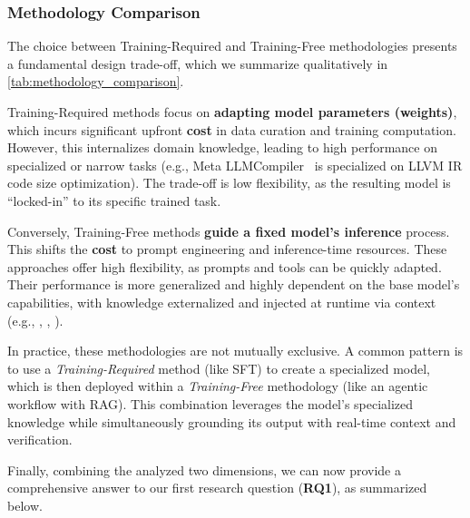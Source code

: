 \documentclass[pdflatex,sn-mathphys-ay,twocolumn, a4paper]{sn-jnl}%
\theoremstyle{thmstyleone}%
\theoremstyle{thmstyletwo}%
\theoremstyle{thmstylethree}%
\begin{document}
\subsubsection{Methodology Comparison}

The choice between Training-Required and Training-Free methodologies presents a fundamental design trade-off, which we summarize qualitatively in \autoref{tab:methodology_comparison}.


Training-Required methods focus on \textbf{adapting model parameters (weights)}, which incurs significant upfront \textbf{cost} in data curation and training computation. However, this internalizes domain knowledge, leading to high performance on specialized or narrow tasks (e.g., Meta LLMCompiler~\citep{metallmcompiler-cc25} is specialized on LLVM IR code size optimization). The trade-off is low flexibility, as the resulting model is ``locked-in'' to its specific trained task.


Conversely, Training-Free methods \textbf{guide a fixed model's inference} process. This shifts the \textbf{cost} to prompt engineering and inference-time resources. These approaches offer high flexibility, as prompts and tools can be quickly adapted. Their performance is more generalized and highly dependent on the base model's capabilities, with knowledge externalized and injected at runtime via context (e.g., \citet{116_xu2024code}, \citet{17_gao2025search}, \citet{8_hu2025compileagent_acl}).

In practice, these methodologies are not mutually exclusive. A common pattern is to use a \textit{Training-Required} method (like SFT) to create a specialized model, which is then deployed within a \textit{Training-Free} methodology (like an agentic workflow with RAG). This combination leverages the model's specialized knowledge while simultaneously grounding its output with real-time context and verification.

Finally, combining the analyzed two dimensions, we can now provide a comprehensive answer to our first research question (\textbf{RQ1}), as summarized below.
\end{document}
